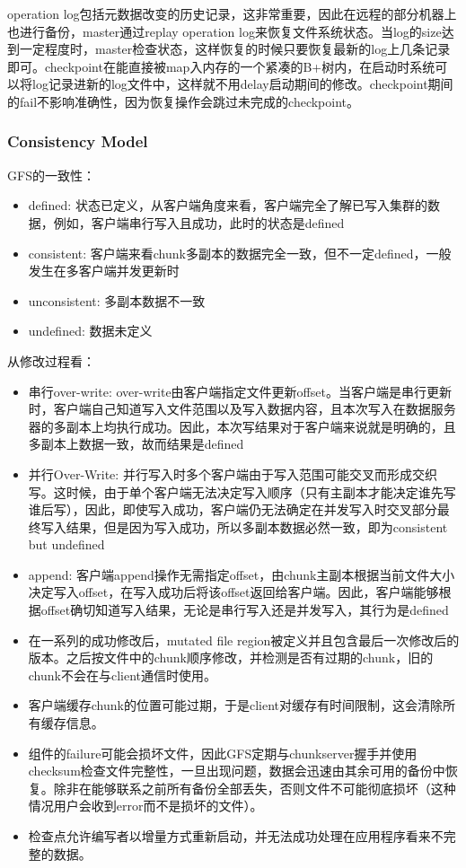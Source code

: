 \documentclass{ctexart}
\begin{document}
operation log包括元数据改变的历史记录，这非常重要，因此在远程的部分机器上也进行备份，master通过replay operation log来恢复文件系统状态。当log的size达到一定程度时，master检查状态，这样恢复的时候只要恢复最新的log上几条记录即可。checkpoint在能直接被map入内存的一个紧凑的B+树内，在启动时系统可以将log记录进新的log文件中，这样就不用delay启动期间的修改。checkpoint期间的fail不影响准确性，因为恢复操作会跳过未完成的checkpoint。
\subsubsection{Consistency Model}
GFS的一致性：
\begin{itemize}
	\item defined: 状态已定义，从客户端角度来看，客户端完全了解已写入集群的数据，例如，客户端串行写入且成功，此时的状态是defined
	\item consistent: 客户端来看chunk多副本的数据完全一致，但不一定defined，一般发生在多客户端并发更新时
	\item unconsistent: 多副本数据不一致
	\item undefined: 数据未定义
\end{itemize}
从修改过程看：
\begin{itemize}
	\item 串行over-write: over-write由客户端指定文件更新offset。当客户端是串行更新时，客户端自己知道写入文件范围以及写入数据内容，且本次写入在数据服务器的多副本上均执行成功。因此，本次写结果对于客户端来说就是明确的，且多副本上数据一致，故而结果是defined
	\item 并行Over-Write: 并行写入时多个客户端由于写入范围可能交叉而形成交织写。这时候，由于单个客户端无法决定写入顺序（只有主副本才能决定谁先写谁后写），因此，即使写入成功，客户端仍无法确定在并发写入时交叉部分最终写入结果，但是因为写入成功，所以多副本数据必然一致，即为consistent but undefined
	\item append: 客户端append操作无需指定offset，由chunk主副本根据当前文件大小决定写入offset，在写入成功后将该offset返回给客户端。因此，客户端能够根据offset确切知道写入结果，无论是串行写入还是并发写入，其行为是defined
	\item 在一系列的成功修改后，mutated file region被定义并且包含最后一次修改后的版本。之后按文件中的chunk顺序修改，并检测是否有过期的chunk，旧的chunk不会在与client通信时使用。
	\item 客户端缓存chunk的位置可能过期，于是client对缓存有时间限制，这会清除所有缓存信息。
	\item 组件的failure可能会损坏文件，因此GFS定期与chunkserver握手并使用checksum检查文件完整性，一旦出现问题，数据会迅速由其余可用的备份中恢复。除非在能够联系之前所有备份全部丢失，否则文件不可能彻底损坏（这种情况用户会收到error而不是损坏的文件）。
	\item 检查点允许编写者以增量方式重新启动，并无法成功处理在应用程序看来不完整的数据。
\end{itemize}
\end{document}
